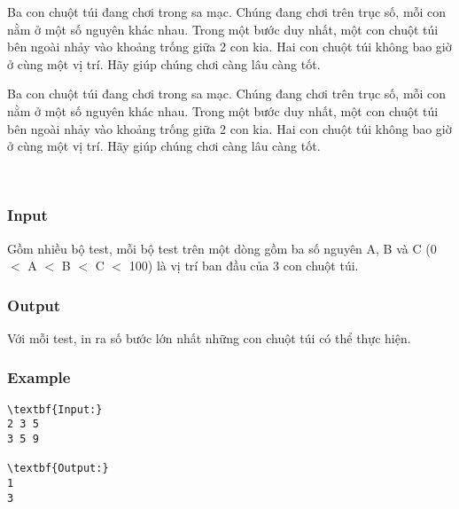 

Ba con chuột túi đang chơi trong sa mạc. Chúng đang chơi trên trục số, mỗi con nằm ở một số nguyên khác nhau. Trong một bước duy nhất, một con chuột túi bên ngoài nhảy vào khoảng trống giữa 2 con kia. Hai con chuột túi không bao giờ ở cùng một vị trí. Hãy giúp chúng chơi càng lâu càng tốt.

Ba con chuột túi đang chơi trong sa mạc. Chúng đang chơi trên trục số, mỗi con nằm ở một số nguyên khác nhau. Trong một bước duy nhất, một con chuột túi bên ngoài nhảy vào khoảng trống giữa 2 con kia. Hai con chuột túi không bao giờ ở cùng một vị trí. Hãy giúp chúng chơi càng lâu càng tốt.

 

\subsubsection{Input}

Gồm nhiều bộ test, mỗi bộ test trên một dòng gồm ba số nguyên A, B và C (0 $<$ A $<$ B $<$ C $<$ 100) là vị trí ban đầu của 3 con chuột túi.

\subsubsection{Output}

Với mỗi test, in ra số bước lớn nhất những con chuột túi có thể thực hiện.

\subsubsection{Example}
\begin{verbatim}
\textbf{Input:}
2 3 5
3 5 9

\textbf{Output:}
1
3\end{verbatim}